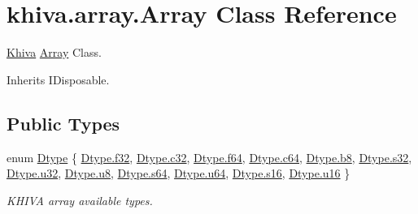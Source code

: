 \hypertarget{classkhiva_1_1array_1_1_array}{}\section{khiva.\+array.\+Array Class Reference}
\label{classkhiva_1_1array_1_1_array}


\mbox{\hyperlink{classkhiva_1_1_khiva}{Khiva}} \mbox{\hyperlink{classkhiva_1_1array_1_1_array}{Array}} Class.  




Inherits I\+Disposable.

\subsection*{Public Types}
\begin{DoxyCompactItemize}
\item 
enum \mbox{\hyperlink{classkhiva_1_1array_1_1_array_a6bc9c0c6ade06a8675643de4880a116c}{Dtype}} \{ \newline
\mbox{\hyperlink{classkhiva_1_1array_1_1_array_a6bc9c0c6ade06a8675643de4880a116ca512dc597be7ae761876315165dc8bd2e}{Dtype.\+f32}}, 
\mbox{\hyperlink{classkhiva_1_1array_1_1_array_a6bc9c0c6ade06a8675643de4880a116ca8c6aa8068da0e0de08691b91863f11f6}{Dtype.\+c32}}, 
\mbox{\hyperlink{classkhiva_1_1array_1_1_array_a6bc9c0c6ade06a8675643de4880a116ca714b98e0a797e8f119f257a4ab802f86}{Dtype.\+f64}}, 
\mbox{\hyperlink{classkhiva_1_1array_1_1_array_a6bc9c0c6ade06a8675643de4880a116ca88da64cd45164153e9f301457d992eb2}{Dtype.\+c64}}, 
\newline
\mbox{\hyperlink{classkhiva_1_1array_1_1_array_a6bc9c0c6ade06a8675643de4880a116ca75d99404a02e2bc993a6bac34c60d679}{Dtype.\+b8}}, 
\mbox{\hyperlink{classkhiva_1_1array_1_1_array_a6bc9c0c6ade06a8675643de4880a116caa860868d23f3a68323a2e3f6563d7f31}{Dtype.\+s32}}, 
\mbox{\hyperlink{classkhiva_1_1array_1_1_array_a6bc9c0c6ade06a8675643de4880a116caa311a831b48d59687cf0822a612c9032}{Dtype.\+u32}}, 
\mbox{\hyperlink{classkhiva_1_1array_1_1_array_a6bc9c0c6ade06a8675643de4880a116ca077393852be20e37026d6281827662f2}{Dtype.\+u8}}, 
\newline
\mbox{\hyperlink{classkhiva_1_1array_1_1_array_a6bc9c0c6ade06a8675643de4880a116ca1919b6c3d1a9b2545d55cd7176afd38b}{Dtype.\+s64}}, 
\mbox{\hyperlink{classkhiva_1_1array_1_1_array_a6bc9c0c6ade06a8675643de4880a116ca476bf781fb66b23778b1004edc3a1028}{Dtype.\+u64}}, 
\mbox{\hyperlink{classkhiva_1_1array_1_1_array_a6bc9c0c6ade06a8675643de4880a116ca396f387f2e22fb295b941df41a05f0dc}{Dtype.\+s16}}, 
\mbox{\hyperlink{classkhiva_1_1array_1_1_array_a6bc9c0c6ade06a8675643de4880a116cade59a481c9d8ace262670bda2b39cb1f}{Dtype.\+u16}}
 \}
\begin{DoxyCompactList}\small\item\em K\+H\+I\+VA array available types. \end{DoxyCompactList}\end{DoxyCompactItemize}
